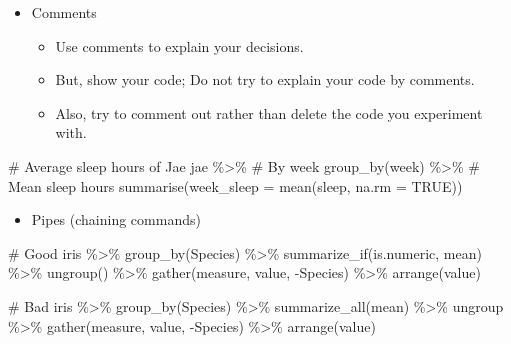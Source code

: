 \documentclass[
  letterpaper,
  DIV=11,
  numbers=noendperiod]{scrreprt}
\newenvironment{Shaded}{\begin{snugshade}}{\end{snugshade}}
\newcommand{\AttributeTok}[1]{\textcolor[rgb]{0.40,0.45,0.13}{#1}}
\newcommand{\CommentTok}[1]{\textcolor[rgb]{0.37,0.37,0.37}{#1}}
\newcommand{\ConstantTok}[1]{\textcolor[rgb]{0.56,0.35,0.01}{#1}}
\newcommand{\FunctionTok}[1]{\textcolor[rgb]{0.28,0.35,0.67}{#1}}
\newcommand{\NormalTok}[1]{\textcolor[rgb]{0.00,0.23,0.31}{#1}}
\newcommand{\SpecialCharTok}[1]{\textcolor[rgb]{0.37,0.37,0.37}{#1}}
\providecommand{\tightlist}{%
  \setlength{\itemsep}{0pt}\setlength{\parskip}{0pt}}\usepackage{longtable,booktabs,array}
\begin{document}
\begin{itemize}
\tightlist
\item
  Comments

  \begin{itemize}
  \tightlist
  \item
    Use comments to explain your decisions.
  \item
    But, show your code; Do not try to explain your code by comments.
  \item
    Also, try to comment out rather than delete the code you experiment
    with.
  \end{itemize}
\end{itemize}

\begin{Shaded}
\begin{Highlighting}[]
\CommentTok{\# Average sleep hours of Jae}
\NormalTok{jae }\SpecialCharTok{\%\textgreater{}\%}
  \CommentTok{\# By week}
  \FunctionTok{group\_by}\NormalTok{(week) }\SpecialCharTok{\%\textgreater{}\%}
  \CommentTok{\# Mean sleep hours }
  \FunctionTok{summarise}\NormalTok{(}\AttributeTok{week\_sleep =} \FunctionTok{mean}\NormalTok{(sleep, }\AttributeTok{na.rm =} \ConstantTok{TRUE}\NormalTok{))}
\end{Highlighting}
\end{Shaded}

\begin{itemize}
\tightlist
\item
  Pipes (chaining commands)
\end{itemize}

\begin{Shaded}
\begin{Highlighting}[]
\CommentTok{\# Good}
\NormalTok{iris }\SpecialCharTok{\%\textgreater{}\%}
  \FunctionTok{group\_by}\NormalTok{(Species) }\SpecialCharTok{\%\textgreater{}\%}
  \FunctionTok{summarize\_if}\NormalTok{(is.numeric, mean) }\SpecialCharTok{\%\textgreater{}\%}
  \FunctionTok{ungroup}\NormalTok{() }\SpecialCharTok{\%\textgreater{}\%}
  \FunctionTok{gather}\NormalTok{(measure, value, }\SpecialCharTok{{-}}\NormalTok{Species) }\SpecialCharTok{\%\textgreater{}\%}
  \FunctionTok{arrange}\NormalTok{(value)}

\CommentTok{\# Bad}
\NormalTok{iris }\SpecialCharTok{\%\textgreater{}\%} \FunctionTok{group\_by}\NormalTok{(Species) }\SpecialCharTok{\%\textgreater{}\%} \FunctionTok{summarize\_all}\NormalTok{(mean) }\SpecialCharTok{\%\textgreater{}\%}
\NormalTok{ungroup }\SpecialCharTok{\%\textgreater{}\%} \FunctionTok{gather}\NormalTok{(measure, value, }\SpecialCharTok{{-}}\NormalTok{Species) }\SpecialCharTok{\%\textgreater{}\%}
\FunctionTok{arrange}\NormalTok{(value)}
\end{Highlighting}
\end{Shaded}
\end{document}
